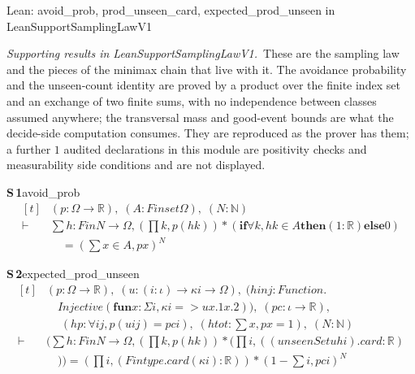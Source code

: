 \documentclass[conference]{IEEEtran}
\theoremstyle{definition}
\newcommand{\lean}[1]{\textsf{\footnotesize #1}}
\newcommand{\leanbox}[1]{%
  \par\vspace{2pt}\noindent
  {\footnotesize\textsf{Lean: #1}}\par\vspace{2pt}}
\begin{document}
\leanbox{\lean{avoid\_prob}, \lean{prod\_unseen\_card}, \lean{expected\_prod\_unseen} in
\lean{LeanSupportSamplingLawV1}}

\noindent\emph{Supporting results in \lean{LeanSupportSamplingLawV1}.}~These are the sampling law and the pieces of the minimax chain that live with it. The avoidance probability and the unseen-count identity are proved by a product over the finite index set and an exchange of two finite sums, with no independence between classes assumed anywhere; the transversal mass and good-event bounds are what the decide-side computation consumes. They are reproduced as the prover has them; a further $1$ audited declarations in this module are positivity checks and measurability side conditions and are not displayed.

\noindent\textbf{S\,1}\quad\lean{avoid\_prob}
{\footnotesize\[ \begin{aligned}[t]
&(\mathit{p} : \Omega \to \mathbb{R} ),\; (\mathit{A} : \mathit{Finset} \Omega ),\; (\mathit{N} : \mathbb{N} )\\
\vdash\;&\textstyle\sum \mathit{h} : \mathit{Fin} \mathit{N} \to \Omega , (\textstyle\prod \mathit{k}, \mathit{p} (\mathit{h} \mathit{k})) * (\mathbf{if} \forall \mathit{k}, \mathit{h} \mathit{k} \in \mathit{A} \mathbf{then} (1:\mathbb{R} ) \mathbf{else} 0)\\
&\quad = (\textstyle\sum \mathit{x} \in \mathit{A}, \mathit{p} \mathit{x}) ^{\mathit{N}}
\end{aligned} \]}

\noindent\textbf{S\,2}\quad\lean{expected\_prod\_unseen}
{\footnotesize\[ \begin{aligned}[t]
&(\mathit{p} : \Omega \to \mathbb{R} ),\; (\mathit{u} : (\mathit{i} : \iota ) \to \kappa \mathit{i} \to \Omega ),\; (\mathit{hinj} : \mathit{Function}.\\
&\quad \mathit{Injective} (\mathbf{fun} \mathit{x} : \Sigma \mathit{i}, \kappa \mathit{i} => \mathit{u} \mathit{x}.1 \mathit{x}.2)),\; (\mathit{pc} : \iota \to \mathbb{R} ),\\
&\quad \; (\mathit{hp} : \forall \mathit{i} \mathit{j}, \mathit{p} (\mathit{u} \mathit{i} \mathit{j}) = \mathit{pc} \mathit{i}),\; (\mathit{htot} : \textstyle\sum \mathit{x}, \mathit{p} \mathit{x} = 1),\; (\mathit{N} : \mathbb{N} )\\
\vdash\;&(\textstyle\sum \mathit{h} : \mathit{Fin} \mathit{N} \to \Omega , (\textstyle\prod \mathit{k}, \mathit{p} (\mathit{h} \mathit{k})) * (\textstyle\prod \mathit{i}, ((\mathit{unseenSet} \mathit{u} \mathit{h} \mathit{i}).\mathit{card} : \mathbb{R} )\\
&\quad )) = (\textstyle\prod \mathit{i}, (\mathit{Fintype}.\mathit{card} (\kappa \mathit{i}) : \mathbb{R} )) * (1 - \textstyle\sum \mathit{i}, \mathit{pc} \mathit{i}) ^{\mathit{N}}
\end{aligned} \]}
\end{document}
